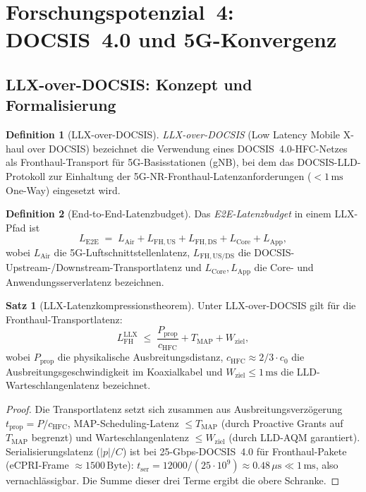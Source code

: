 ﻿\documentclass[a4paper,12pt]{article}
\theoremstyle{definition}
\newtheorem{definition}{Definition}
\newtheorem{satz}{Satz}
\begin{document}
\section{Forschungspotenzial~4: DOCSIS~4.0 und 5G-Konvergenz}

\subsection{LLX-over-DOCSIS: Konzept und Formalisierung}

\begin{definition}[LLX-over-DOCSIS]
    \emph{LLX-over-DOCSIS} (Low Latency Mobile X-haul over DOCSIS) bezeichnet
    die Verwendung eines DOCSIS~4.0-HFC-Netzes als Fronthaul-Transport f\"{u}r
    5G-Basisstationen (gNB), bei dem das DOCSIS-LLD-Protokoll zur Einhaltung
    der 5G-NR-Fronthaul-Latenzanforderungen ($< 1\,\mathrm{ms}$ One-Way) eingesetzt
    wird.
\end{definition}

\begin{definition}[End-to-End-Latenzbudget]
    Das \emph{E2E-Latenzbudget} in einem LLX-Pfad ist
    \[
        L_{\mathrm{E2E}} \;=\; L_{\mathrm{Air}} + L_{\mathrm{FH,US}} + L_{\mathrm{FH,DS}} + L_{\mathrm{Core}} + L_{\mathrm{App}},
    \]
    wobei $L_{\mathrm{Air}}$ die 5G-Luftschnittstellenlatenz, $L_{\mathrm{FH,US/DS}}$
    die DOCSIS-Upstream-/Downstream-Transportlatenz und $L_{\mathrm{Core}}, L_{\mathrm{App}}$
    die Core- und Anwendungsserverlatenz bezeichnen.
\end{definition}

\begin{satz}[LLX-Latenzkompressionstheorem]
    \label{satz:llx}
    Unter LLX-over-DOCSIS gilt f\"{u}r die Fronthaul-Transportlatenz:
    \[
        L_{\mathrm{FH}}^{\mathrm{LLX}} \;\leq\; \frac{P_{\mathrm{prop}}}{c_{\mathrm{HFC}}} + T_{\mathrm{MAP}} + W_{\mathrm{ziel}},
    \]
    wobei $P_{\mathrm{prop}}$ die physikalische Ausbreitungsdistanz,
    $c_{\mathrm{HFC}} \approx 2/3 \cdot c_0$ die Ausbreitungsgeschwindigkeit im
    Koaxialkabel und $W_{\mathrm{ziel}} \leq 1\,\mathrm{ms}$ die LLD-Warteschlangenlatenz
    bezeichnet.
\end{satz}

\begin{proof}
    Die Transportlatenz setzt sich zusammen aus Ausbreitungsverzögerung
    $t_{\mathrm{prop}} = P/c_{\mathrm{HFC}}$, MAP-Scheduling-Latenz $\leq T_{\mathrm{MAP}}$
    (durch Proactive Grants auf $T_{\mathrm{MAP}}$ begrenzt) und
    Warteschlangenlatenz $\leq W_{\mathrm{ziel}}$ (durch LLD-AQM garantiert).
    Serialisierungslatenz ($|p|/C$) ist bei 25-Gbps-DOCSIS~4.0 f\"{u}r
    Fronthaul-Pakete (eCPRI-Frame $\approx 1500\,\mathrm{Byte}$):
    $t_{\mathrm{ser}} = 12000/(25 \cdot 10^9) \approx 0.48\,\mu\mathrm{s} \ll 1\,\mathrm{ms}$,
    also vernachl\"{a}ssigbar. Die Summe dieser drei Terme ergibt die obere Schranke.
\end{proof}
\end{document}
